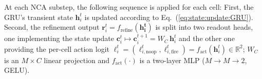 \documentclass[letterpaper]{article}
\newcommand{\bh}[1]{{\color{black}#1}}  %
\begin{document}
At each NCA substep, the following sequence is applied for each cell\bh{: 
First, the GRU's transient state $\mathbf{h}_i^t$ is updated according to Eq.~(\ref{eq:state:update:GRU}).
Second, the refinement output $\mathbf{r}_i^t=f_\text{refine}(\mathbf{\mathbf{h}_i^t})$ is split into two readout heads, one implementing the state update $\mathbf{c}_i^{t}\mapsto\mathbf{c}_i^{t+1}=W_{C}\,\mathbf{h}_i^t$ and the other one providing the per-cell action logit $\boldsymbol{\ell}_i^t=(\ell_{i,\text{noop}}^t,\ell_{i,\text{fire}}^t)=f_{\text{act}}(\mathbf{h}_i^t) \in \mathbb{R}^{2}$; $W_{C}$ 
}
%
%
is an \bh{$M \times C$} linear \bh{projection}
and \bh{$f_\text{act}(\cdot)$}
is a two-layer MLP 
\bh{($M \to M \to 2$, GELU)}. 


\end{document}
